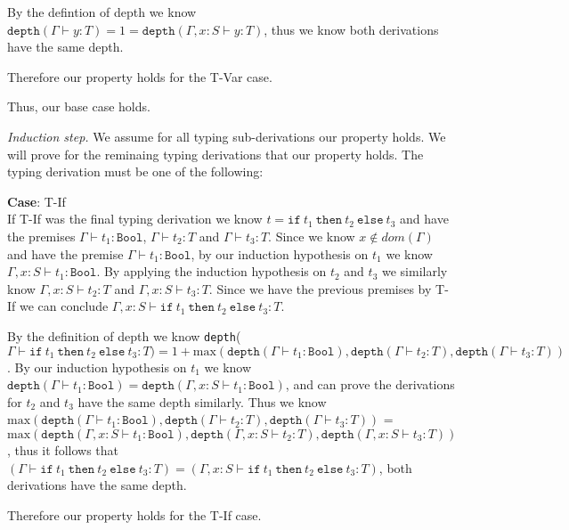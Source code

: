 \documentclass[12pt, fleqn]{article}
\begin{document}
By the defintion of depth we know $\texttt{depth}(\Gamma \vdash y : T) = 1 = 
\texttt{depth}(\Gamma, x: S \vdash y : T)$, thus we know both derivations have the same depth.

Therefore our property holds for the T-Var case.

\medskip
Thus, our base case holds.

\medskip
\emph{Induction step.} We assume for all typing sub-derivations our property holds. We will prove for the reminaing typing derivations
that our property holds. The typing derivation must be one of the following:

\medskip
\textbf{Case}: T-If\\
If T-If was the final typing derivation we know $t = \texttt{if}\:t_1\:\texttt{then}\:t_2\:\texttt{else}\:t_3$ and
have the premises $\Gamma \vdash t_1 : \texttt{Bool}$, $\Gamma \vdash t_2 : T$ and $\Gamma \vdash t_3 : T$. Since we
know $x \notin dom(\Gamma)$ and have the premise $\Gamma \vdash t_1 : \texttt{Bool}$, by our 
induction hypothesis on $t_1$ we know $\Gamma, x: S \vdash t_1 : \texttt{Bool}$. By applying the induction hypothesis on $t_2$ and
$t_3$ we similarly know $\Gamma,x: S \vdash t_2 : T$ and $\Gamma, x: S \vdash t_3 : T$. Since we have the previous premises by
T-If we can conclude $\Gamma, x : S \vdash \texttt{if}\:t_1\:\texttt{then}\:t_2\:\texttt{else}\:t_3 : T$. 

By the definition of depth we know \texttt{depth}($\Gamma \vdash \texttt{if}\:t_1\:\texttt{then}\:t_2\:\texttt{else}\:t_3 : T) = 1 + 
\textrm{max}(\texttt{depth}(\Gamma \vdash t_1 : \texttt{Bool}), \texttt{depth}(\Gamma \vdash t_2 : T), \texttt{depth}(\Gamma \vdash t_3 : T))$.
By our induction hypothesis on $t_1$ we know $\texttt{depth}(\Gamma \vdash t_1 : \texttt{Bool}) = \texttt{depth}(\Gamma,x:S \vdash t_1 : \texttt{Bool})$,
and can prove the derivations for $t_2$ and $t_3$ have the same depth similarly. Thus we know 
$\textrm{max}(\texttt{depth}(\Gamma \vdash t_1 : \texttt{Bool}), \texttt{depth}(\Gamma \vdash t_2 : T), \texttt{depth}(\Gamma \vdash t_3 : T))$
= $\textrm{max}(\texttt{depth}(\Gamma, x:S \vdash t_1 : \texttt{Bool}), \texttt{depth}(\Gamma, x: S \vdash t_2 : T), \texttt{depth}(\Gamma, x: S \vdash t_3 : T))$,
thus it follows that $(\Gamma \vdash \texttt{if}\:t_1\:\texttt{then}\:t_2\:\texttt{else}\:t_3 : T) = 
(\Gamma, x: S \vdash \texttt{if}\:t_1\:\texttt{then}\:t_2\:\texttt{else}\:t_3 : T)$, both derivations have the same depth.

Therefore our property holds for the T-If case.
\end{document}
